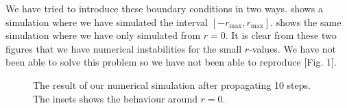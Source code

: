 We have tried to introduce these boundary conditions in two ways.  shows a
simulation where we have simulated the interval \mbox{$[-r_\text{max},r_\text{max}]$}.  shows the same simulation
where we have only simulated from $r = 0$. It is clear from these two figures that we have numerical
instabilities for the small $r$-values. We have not been able to solve this problem so we have not
been able to reproduce \cite{prl-selffocus}[Fig. 1]. 
\begin{figure}[htb]
  \centering
  \hfill
  \caption{The result of our numerical simulation after propagating 10 steps. The insets shows the
    behaviour around $r=0$.}
  \label{fig:kerr-num}
\end{figure}



